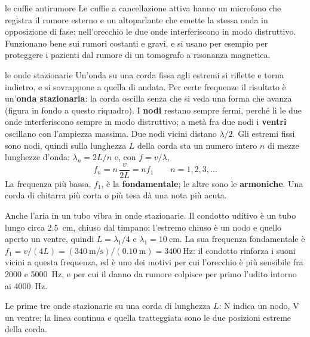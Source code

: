 \begin{applicazione}{le cuffie antirumore}
Le cuffie a cancellazione attiva hanno un microfono che registra il rumore esterno e un altoparlante che emette la stessa onda in opposizione di fase: nell'orecchio le due onde interferiscono in modo distruttivo. Funzionano bene sui rumori costanti e gravi, e si usano per esempio per proteggere i pazienti dal rumore di un tomografo a risonanza magnetica.
\end{applicazione}

\begin{approfondimento}{le onde stazionarie}
Un'onda su una corda fissa agli estremi si riflette e torna indietro, e si sovrappone a quella di andata. Per certe frequenze il risultato è un'\textbf{onda stazionaria}: la corda oscilla senza che si veda una forma che avanza (figura in fondo a questo riquadro). I \textbf{nodi} restano sempre fermi, perché lì le due onde interferiscono sempre in modo distruttivo; a metà fra due nodi i \textbf{ventri} oscillano con l'ampiezza massima. Due nodi vicini distano $\lambda/2$. Gli estremi fissi sono nodi, quindi sulla lunghezza $L$ della corda sta un numero intero $n$ di mezze lunghezze d'onda: $\lambda_n = 2L/n$ e, con $f = v/\lambda$,
\[
  f_n = n\,\frac{v}{2L} = n f_1 \qquad n = 1, 2, 3, \dots
\]
La frequenza più bassa, $f_1$, è la \textbf{fondamentale}; le altre sono le \textbf{armoniche}. Una corda di chitarra più corta o più tesa dà una nota più acuta.

Anche l'aria in un tubo vibra in onde stazionarie. Il condotto uditivo è un tubo lungo circa \SI{2,5}{\centi\metre}, chiuso dal timpano: l'estremo chiuso è un nodo e quello aperto un ventre, quindi $L = \lambda_1/4$ e $\lambda_1 = \SI{10}{\centi\metre}$. La sua frequenza fondamentale è $f_1 = v/(4L) = (\SI{340}{\metre\per\second})/(\SI{0,10}{\metre}) = \SI{3400}{\hertz}$: il condotto rinforza i suoni vicini a questa frequenza, ed è uno dei motivi per cui l'orecchio è più sensibile fra 2000 e \SI{5000}{\hertz}, e per cui il danno da rumore colpisce per primo l'udito intorno ai \SI{4000}{\hertz}.

\begin{center}

\end{center}
Le prime tre onde stazionarie su una corda di lunghezza $L$: N indica un nodo, V un ventre; la linea continua e quella tratteggiata sono le due posizioni estreme della corda.
\end{approfondimento}

